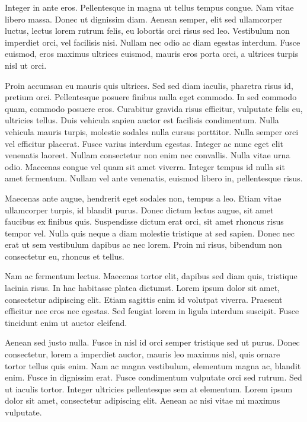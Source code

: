 Integer in ante eros. Pellentesque in magna ut tellus tempus congue. Nam vitae libero massa. Donec ut dignissim diam. Aenean semper, elit sed ullamcorper luctus, lectus lorem rutrum felis, eu lobortis orci risus sed leo. Vestibulum non imperdiet orci, vel facilisis nisi. Nullam nec odio ac diam egestas interdum. Fusce euismod, eros maximus ultrices euismod, mauris eros porta orci, a ultrices turpis nisl ut orci.

Proin accumsan eu mauris quis ultrices. Sed sed diam iaculis, pharetra risus id, pretium orci. Pellentesque posuere finibus nulla eget commodo. In sed commodo quam, commodo posuere eros. Curabitur gravida risus efficitur, vulputate felis eu, ultricies tellus. Duis vehicula sapien auctor est facilisis condimentum. Nulla vehicula mauris turpis, molestie sodales nulla cursus porttitor. Nulla semper orci vel efficitur placerat. Fusce varius interdum egestas. Integer ac nunc eget elit venenatis laoreet. Nullam consectetur non enim nec convallis. Nulla vitae urna odio. Maecenas congue vel quam sit amet viverra. Integer tempus id nulla sit amet fermentum. Nullam vel ante venenatis, euismod libero in, pellentesque risus.

Maecenas ante augue, hendrerit eget sodales non, tempus a leo. Etiam vitae ullamcorper turpis, id blandit purus. Donec dictum lectus augue, sit amet faucibus ex finibus quis. Suspendisse dictum erat orci, sit amet rhoncus risus tempor vel. Nulla quis neque a diam molestie tristique at sed sapien. Donec nec erat ut sem vestibulum dapibus ac nec lorem. Proin mi risus, bibendum non consectetur eu, rhoncus et tellus.

Nam ac fermentum lectus. Maecenas tortor elit, dapibus sed diam quis, tristique lacinia risus. In hac habitasse platea dictumst. Lorem ipsum dolor sit amet, consectetur adipiscing elit. Etiam sagittis enim id volutpat viverra. Praesent efficitur nec eros nec egestas. Sed feugiat lorem in ligula interdum suscipit. Fusce tincidunt enim ut auctor eleifend.

Aenean sed justo nulla. Fusce in nisl id orci semper tristique sed ut purus. Donec consectetur, lorem a imperdiet auctor, mauris leo maximus nisl, quis ornare tortor tellus quis enim. Nam ac magna vestibulum, elementum magna ac, blandit enim. Fusce in dignissim erat. Fusce condimentum vulputate orci sed rutrum. Sed ut iaculis tortor. Integer ultricies pellentesque sem at elementum. Lorem ipsum dolor sit amet, consectetur adipiscing elit. Aenean ac nisi vitae mi maximus vulputate.

